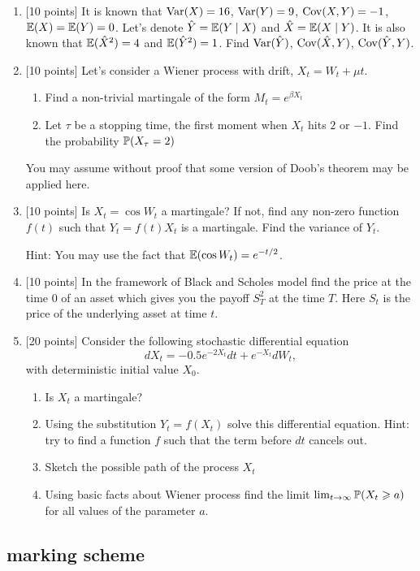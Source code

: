\documentclass[12pt, a4paper]{article}
\begin{document}
\begin{enumerate}
\item $[$10 points] It is known that $\Var(X)=16$, $\Var(Y)=9$, $\Cov(X,Y)=-1$, $\E(X)=\E(Y)=0$. Let's denote $\hat{Y}=\E(Y \mid X)$ and $\hat{X}=\E(X \mid Y)$. It is also known that $\E(\hat{X}^2)=4$ and $\E(\hat{Y}^2)=1$.  Find $\Var(\hat{Y})$, $\Cov(\hat{X},Y)$, $\Cov(\hat{Y},Y)$.
\item $[$10 points] Let's consider a Wiener process with drift, $X_t=W_t+\mu t$.
\begin{enumerate}
\item Find a non-trivial martingale of the form $M_t=e^{\beta X_t}$
\item Let $\tau$ be a stopping time, the first moment when $X_t$ hits $2$ or $-1$. Find the probability $\P(X_\tau=2)$
\end{enumerate}
You may assume without proof that some version of Doob's theorem may be applied here.
\item $[$10 points] Is $X_t=\cos W_t$ a martingale? If not, find any non-zero function $f(t)$ such that $Y_t=f(t)X_t$ is a martingale. Find the variance of $Y_t$.

Hint: You may use the fact that $\E(\cos W_t)=e^{-t/2}$.

\item $[$10 points] In the framework of Black and Scholes model find the price at the time $0$ of an asset which gives you the payoff $S_T^2$ at the time $T$. Here $S_t$ is the price of the underlying asset at time $t$.
\item $[$20 points] Consider the following stochastic differential equation
\[
dX_t=-0.5e^{-2X_t}dt+e^{-X_t}dW_t,
\]
with deterministic initial value $X_0$.
\begin{enumerate}
\item Is $X_t$ a martingale?
\item Using the substitution $Y_t=f(X_t)$ solve this differential equation. Hint: try to find a function $f$ such that the term before $dt$ cancels out.
\item Sketch the possible path of the process $X_t$
\item Using basic facts about Wiener process find the limit $\lim_{t\to\infty} \P(X_t \geq a)$ for all values of the parameter $a$.
\end{enumerate}

\end{enumerate}

\subsection{marking scheme}
\end{document}
